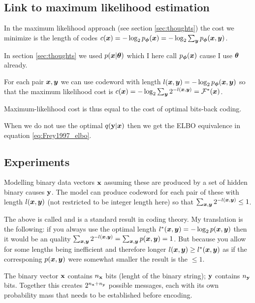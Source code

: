 \subsection{Link to maximum likelihood estimation}

In the maximum likelihood approach (see section \ref{sec:thoughts}) the cost we minimize is the length of codes $c({\bm{x}}) = - \log_2 p_{{\bm{\phi}}}({\bm{x}}) = - \log_2 \sum_{\bm{y}} p_{{\bm{\phi}}}({\bm{x}}, {\bm{y}})$.

\begin{notebox}[colback=yellow!5]
In section \ref{sec:thoughts} we used $p({\bm{x}} | {\bm{\theta}})$ which I here call $p_{{\bm{\phi}}}({\bm{x}})$ cause I use ${\bm{\theta}}$ already.
\end{notebox}

For each pair ${\bm{x}}, {\bm{y}}$ we can use codeword with length $l({\bm{x}}, {\bm{y}}) = -\log_2 p_{{\bm{\phi}}}({\bm{x}}, {\bm{y}})$ so that the maximum likelihood cost is $c({\bm{x}}) = -\log_2 \sum_{\bm{y}}  2^{- l({\bm{x}}, {\bm{y}})} = \mathcal{F^*}({\bm{x}})$.
\begin{notebox}
Maximum-likelihood cost is thus equal to the cost of optimal bits-back coding.
\end{notebox}

When we do not use the optimal $q({\mathbf{y}} | {\bm{x}})$ then we get the ELBO equivalence in equation \eqref{eq:Frey1997_elbo}.

\subsection{Experiments}

Modelling binary data vectors ${\mathbf{x}}$ assuming these are produced by a set of hidden binary causes ${\mathbf{y}}$.
The model can produce codeword for each pair of these with length $l({\bm{x}}, {\bm{y}})$ (not restricted to be integer length here) so that $\sum_{{\bm{x}}, {\bm{y}}} 2^{-l({\bm{x}}, {\bm{y}})} \leq 1$.

\begin{notebox}[colback=yellow!5]
The above is called  and is a standard result in coding theory.
My translation is the following: if you always use the optimal length $l^*({\bm{x}}, {\bm{y}}) = - \log_2 p({\bm{x}}, {\bm{y}})$ then it would be an quality $\sum_{{\bm{x}}, {\bm{y}}} 2^{-l({\bm{x}}, {\bm{y}})} = \sum_{{\bm{x}}, {\bm{y}}} p({\bm{x}}, {\bm{y}}) = 1$.
But because you allow for some lengths being inefficient and therefore longer $l({\bm{x}}, {\bm{y}}) \geq l^*({\bm{x}}, {\bm{y}})$ as if the corresponing $p({\bm{x}}, {\bm{y}})$ were somewhat smaller the result is the $\leq 1$.
\end{notebox}

The binary vector ${\mathbf{x}}$ contains $n_{{\mathbf{x}}}$ bits (lenght of the binary string); ${\mathbf{y}}$ contains $n_{{\mathbf{y}}}$ bits.
Together this creates $2^{n_{{\mathbf{x}}} + n_{{\mathbf{y}}}}$ possible messages, each with its own probability mass that needs to be established before encoding.


